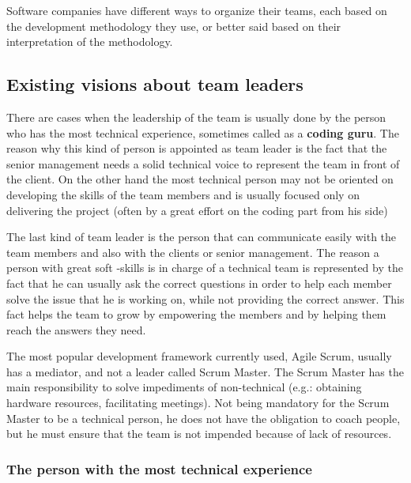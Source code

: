 

Software companies have different ways to organize their teams, each based on the development methodology they use, or better said based on their interpretation of the methodology.
\subsection{Existing visions about team leaders}
\label{sub-sec:existingvisionsaboutteamleaders}



There are cases when the leadership of the team is usually done by the person who has the most technical experience, sometimes called as a \textbf{coding guru}. The reason why this kind of person is appointed as team leader is the fact that  the senior management needs a solid technical voice to represent the team in front of the client. On the other hand the most technical person may not be oriented on developing the skills of the team members and is usually focused only on delivering the project (often by a great effort on the coding part from his side)

The last kind of team leader is the person that can communicate easily with the team members and also with the clients or senior management. The reason a person with great soft -skills is in charge of a technical team is represented by the fact that he can usually ask the correct questions in order to help each member solve the issue that he is working on, while not providing the correct answer. This fact helps the team to grow by empowering the members and by helping them reach the answers they need.

The most popular development framework currently used, Agile Scrum, usually has a mediator, and not a leader called Scrum Master. The Scrum Master has the main responsibility  to solve impediments of non-technical (e.g.: obtaining hardware resources, facilitating meetings). Not being mandatory for the Scrum Master to be a technical person, he does not have the obligation to coach people, but he must ensure that the team is not impended because of lack of resources.

\subsubsection{The person with the most technical experience}

